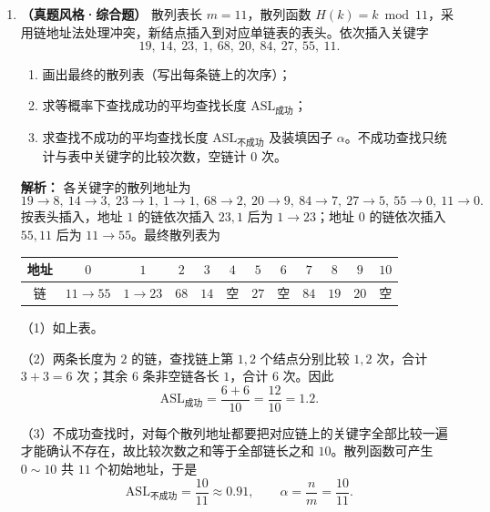 \begin{enumerate}[resume]
\vspace{6pt}

\item \textbf{（真题风格·综合题）} 散列表长 $m=11$，散列函数 $H(k)=k\bmod 11$，采用链地址法处理冲突，新结点插入到对应单链表的表头。依次插入关键字
\[
19,\ 14,\ 23,\ 1,\ 68,\ 20,\ 84,\ 27,\ 55,\ 11.
\]
\begin{enumerate}
    \item[(1)] 画出最终的散列表（写出每条链上的次序）；
    \item[(2)] 求等概率下查找成功的平均查找长度 $\mathrm{ASL}_{\text{成功}}$；
    \item[(3)] 求查找不成功的平均查找长度 $\mathrm{ASL}_{\text{不成功}}$ 及装填因子 $\alpha$。不成功查找只统计与表中关键字的比较次数，空链计 $0$ 次。
\end{enumerate}

\ifshowsolutions\par\noindent\textbf{解析：} 各关键字的散列地址为
\[
19\to8,\ 14\to3,\ 23\to1,\ 1\to1,\ 68\to2,\ 20\to9,\ 84\to7,\ 27\to5,\ 55\to0,\ 11\to0.
\]
按表头插入，地址 $1$ 的链依次插入 $23,1$ 后为 $1\to23$；地址 $0$ 的链依次插入 $55,11$ 后为 $11\to55$。最终散列表为
\begin{center}
\begin{tabular}{c|ccccccccccc}
\hline
地址 & $0$ & $1$ & $2$ & $3$ & $4$ & $5$ & $6$ & $7$ & $8$ & $9$ & $10$\\
\hline
链 & $11\to55$ & $1\to23$ & $68$ & $14$ & 空 & $27$ & 空 & $84$ & $19$ & $20$ & 空\\
\hline
\end{tabular}
\end{center}
（1）如上表。

（2）两条长度为 $2$ 的链，查找链上第 $1,2$ 个结点分别比较 $1,2$ 次，合计 $3+3=6$ 次；其余 $6$ 条非空链各长 $1$，合计 $6$ 次。因此
\[
\mathrm{ASL}_{\text{成功}}=\frac{6+6}{10}=\frac{12}{10}=1.2.
\]

（3）不成功查找时，对每个散列地址都要把对应链上的关键字全部比较一遍才能确认不存在，故比较次数之和等于全部链长之和 $10$。散列函数可产生 $0\sim10$ 共 $11$ 个初始地址，于是
\[
\mathrm{ASL}_{\text{不成功}}=\frac{10}{11}\approx0.91,\qquad
\alpha=\frac{n}{m}=\frac{10}{11}.
\]
\par\noindent{}\else \answerarea[8] \fi

\vspace{6pt}


\end{enumerate}
